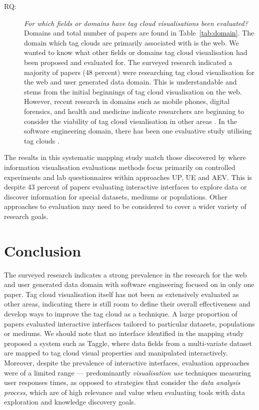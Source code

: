 \begin{description}
\item[RQ:]\textit{ For which fields or domains have tag cloud visualisations been evaluated?} Domains  and total number of papers are found in Table~\vref{tab:domain}. The domain which tag clouds are primarily associated with is the web. We wanted to know what other fields or domains tag cloud visualisation had been proposed and evaluated for.  The surveyed research indicated a majority of papers (48 percent) were researching tag cloud visualisation for the web and user generated data domain. This is understandable and stems from the initial beginnings of tag cloud visualisation on the web. However, recent research in domains such as mobile phones, digital forensics, and health and medicine indicate researchers are beginning to consider the viability of tag cloud visualisation in other areas \citep[such as][]{ogrady12, aras09, jankun11}. In the software engineering domain, there has been one evaluative study utilising tag clouds \citep{kurtz11}.

\end{description}

The results in this systematic mapping study match those discovered by \citet{lam12} where information visualisation evaluations methods focus primarily on controlled experiments and lab questionnaires within approaches UP, UE and AEV. This is despite 43 percent of papers evaluating interactive interfaces to explore data or discover information for special datasets, mediums or populations. Other approaches to evaluation may need to be considered to cover a wider variety of research goals.

\section{Conclusion}\label{sect:mappingconclusions}

The surveyed research indicates a strong prevalence in the research for the web and user generated data domain with software engineering focused on in only one paper. Tag cloud visualisation itself has not been as extensively evaluated as other areas, indicating there is still room to define their overall effectiveness and develop ways to improve the tag cloud as a technique. A large proportion of papers evaluated interactive interfaces tailored to particular datasets, populations or mediums. We should note that no interface identified in the mapping study proposed a system such as Taggle, where data fields from a multi-variate dataset are mapped to tag cloud visual properties and manipulated interactively. Moreover, despite the prevalence of interactive interfaces, evaluation approaches were of a limited range --- predominantly \emph{visualisation use} techniques measuring user responses times, as opposed to strategies that consider the \emph{data analysis process}, which are of high relevance and value when evaluating tools with data exploration and knowledge discovery goals. 


